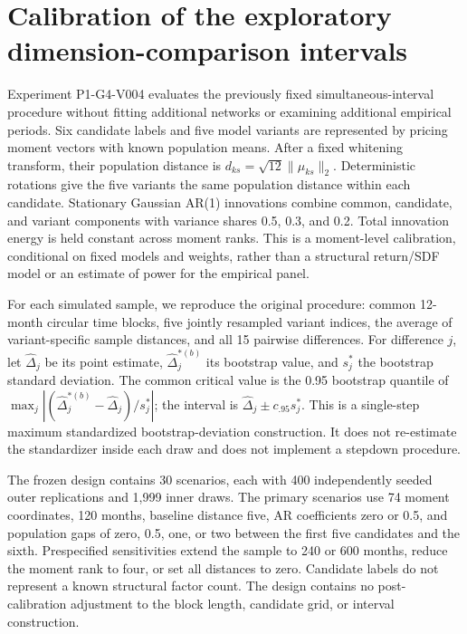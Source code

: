 \section{Calibration of the exploratory dimension-comparison intervals}
\label{app:inference-calibration}

Experiment P1-G4-V004 evaluates the previously fixed simultaneous-interval
procedure without fitting additional networks or examining additional empirical
periods. Six candidate labels and five model variants are represented by pricing
moment vectors with known population means. After a fixed whitening transform,
their population distance is $d_{ks}=\sqrt{12}\|\mu_{ks}\|_2$. Deterministic
rotations give the five variants the same population distance within each
candidate. Stationary Gaussian AR(1) innovations combine common, candidate, and
variant components with variance shares 0.5, 0.3, and 0.2. Total innovation energy
is held constant across moment ranks. This is a moment-level calibration,
conditional on fixed models and weights, rather than a structural return/SDF
model or an estimate of power for the empirical panel.

For each simulated sample, we reproduce the original procedure: common
12-month circular time blocks, five jointly resampled variant indices, the
average of variant-specific sample distances, and all 15 pairwise differences.
For difference $j$, let $\widehat\Delta_j$ be its point estimate,
$\widehat\Delta_j^{*(b)}$ its bootstrap value, and $s_j^*$ the bootstrap standard
deviation. The common critical value is the 0.95 bootstrap quantile of
$\max_j |(\widehat\Delta_j^{*(b)}-\widehat\Delta_j)/s_j^*|$; the interval is
$\widehat\Delta_j\pm c_{.95}s_j^*$. This is a single-step maximum standardized
bootstrap-deviation construction. It does not re-estimate the standardizer
inside each draw and does not implement a stepdown procedure.

The frozen design contains 30 scenarios, each with 400 independently seeded
outer replications and 1,999 inner draws. The primary scenarios use 74 moment
coordinates, 120 months, baseline distance five, AR coefficients zero or 0.5,
and population gaps of zero, 0.5, one, or two between the first five candidates
and the sixth. Prespecified sensitivities extend the sample to 240 or 600 months,
reduce the moment rank to four, or set all distances to zero. Candidate labels
do not represent a known structural factor count. The design contains no
post-calibration adjustment to the block length, candidate grid, or interval
construction.

